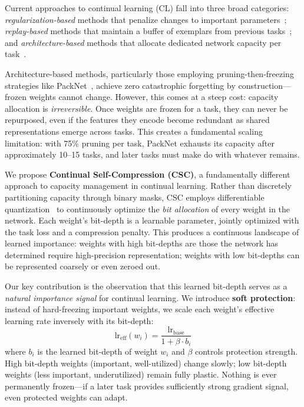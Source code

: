 \documentclass[11pt]{article}
\begin{document}
Current approaches to continual learning (CL) fall into three broad categories: \textit{regularization-based} methods that penalize changes to important parameters~\citep{kirkpatrick2017overcoming, zenke2017continual, aljundi2018memory}; \textit{replay-based} methods that maintain a buffer of exemplars from previous tasks~\citep{rebuffi2017icarl, buzzega2020dark, chaudhry2019tiny}; and \textit{architecture-based} methods that allocate dedicated network capacity per task~\citep{mallya2018packnet, hung2019compacting, rusu2016progressive}.

Architecture-based methods, particularly those employing pruning-then-freezing strategies like PackNet~\citep{mallya2018packnet}, achieve zero catastrophic forgetting by construction---frozen weights cannot change.
However, this comes at a steep cost: capacity allocation is \textit{irreversible}.
Once weights are frozen for a task, they can never be repurposed, even if the features they encode become redundant as shared representations emerge across tasks.
This creates a fundamental scaling limitation: with 75\% pruning per task, PackNet exhausts its capacity after approximately 10--15 tasks, and later tasks must make do with whatever remains.

We propose \textbf{Continual Self-Compression (CSC)}, a fundamentally different approach to capacity management in continual learning.
Rather than discretely partitioning capacity through binary masks, CSC employs differentiable quantization~\citep{csefalvay2023self} to continuously optimize the \textit{bit allocation} of every weight in the network.
Each weight's bit-depth is a learnable parameter, jointly optimized with the task loss and a compression penalty.
This produces a continuous landscape of learned importance: weights with high bit-depths are those the network has determined require high-precision representation; weights with low bit-depths can be represented coarsely or even zeroed out.

Our key contribution is the observation that this learned bit-depth serves as a \textit{natural importance signal} for continual learning.
We introduce \textbf{soft protection}: instead of hard-freezing important weights, we scale each weight's effective learning rate inversely with its bit-depth:
\begin{equation}
    \text{lr}_{\text{eff}}(w_i) = \frac{\text{lr}_{\text{base}}}{1 + \beta \cdot b_i}
    \label{eq:soft_protection}
\end{equation}
where $b_i$ is the learned bit-depth of weight $w_i$ and $\beta$ controls protection strength.
High bit-depth weights (important, well-utilized) change slowly; low bit-depth weights (less important, underutilized) remain fully plastic.
Nothing is ever permanently frozen---if a later task provides sufficiently strong gradient signal, even protected weights can adapt.
\end{document}
